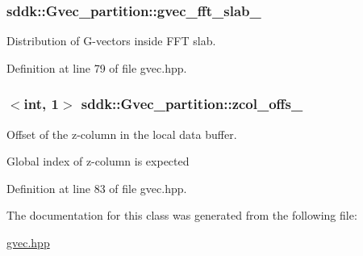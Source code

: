 \subsubsection[{gvec\+\_\+fft\+\_\+slab\+\_\+}]{ sddk\+::\+Gvec\+\_\+partition\+::gvec\+\_\+fft\+\_\+slab\+\_\+\hspace{0.3cm}{\ttfamily [private]}}\label{classsddk_1_1_gvec__partition_a1bbdc7cf03e46984293f7b25e7aedd81}


Distribution of G-\/vectors inside F\+F\+T slab. 



Definition at line 79 of file gvec.\+hpp.

\hypertarget{classsddk_1_1_gvec__partition_a596e5213a3df246471067aec057a355e}{}
\subsubsection[{zcol\+\_\+offs\+\_\+}]{$<$int, 1$>$ sddk\+::\+Gvec\+\_\+partition\+::zcol\+\_\+offs\+\_\+\hspace{0.3cm}{\ttfamily [private]}}\label{classsddk_1_1_gvec__partition_a596e5213a3df246471067aec057a355e}


Offset of the z-\/column in the local data buffer. 

Global index of z-\/column is expected 

Definition at line 83 of file gvec.\+hpp.



The documentation for this class was generated from the following file\+:\begin{DoxyCompactItemize}
\item 
\hyperlink{gvec_8hpp}{gvec.\+hpp}\end{DoxyCompactItemize}
